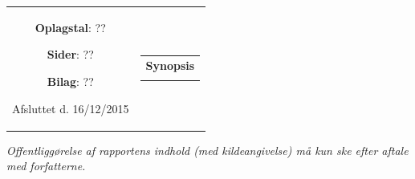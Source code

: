 \begin{nopagebreak}
{\begin{tabular}{cc}
{\begin{description}
\item {\textbf{Oplagstal}: ??}
\item \textbf{Sider}: ?? 
\item \textbf{Bilag}: ??
\item {Afsluttet d. 16/12/2015} 
\end{description}
\vfill } &
\parbox{7cm}{
  \vspace{.15cm}
  \hfill 
  \begin{tabular}{l}
  \textbf{Synopsis}\bigskip \\
  \fbox{
    \parbox{6.5cm}{\bigskip
     {\vfill{\small 
     \bigskip}}
     }}
   \end{tabular}}
\end{tabular}} \vspace{1.3cm}
\centering
\textit{\tiny Offentliggørelse af rapportens indhold (med kildeangivelse) må kun ske efter aftale med forfatterne.}
\\
\end{nopagebreak}
%
